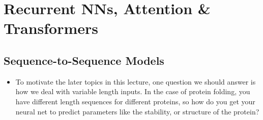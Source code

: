 \section{Recurrent NNs, Attention \& Transformers}
\subsection{Sequence-to-Sequence Models}
\begin{itemize}
	\item To motivate the later topics in this lecture, one question we should answer
		is how we deal with variable length inputs. In the case of protein folding,
		you have different length sequences for different proteins, so how do you get
		your neural net to predict parameters like the stability, or structure of the
		protein?


\end{itemize}
